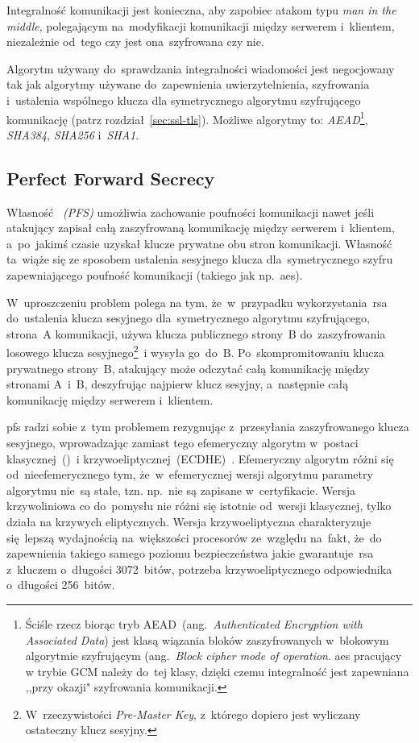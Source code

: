 \documentclass[thesis]{subfiles}
\begin{document}
Integralność komunikacji jest konieczna, aby zapobiec atakom typu \emph{man in the middle}, polegającym na~modyfikacji komunikacji między serwerem i~klientem, niezależnie od~tego czy jest ona~szyfrowana czy nie.

Algorytm używany do~sprawdzania integralności wiadomości jest negocjowany tak jak algorytmy używane do~zapewnienia uwierzytelnienia, szyfrowania i~ustalenia wspólnego klucza dla symetrycznego algorytmu szyfrującego komunikację (patrz rozdział~\ref{sec:ssl-tls}). Możliwe algorytmy to: \emph{AEAD}\footnote{Ściśle rzecz biorąc tryb AEAD~(ang.~\emph{Authenticated Encryption with Associated Data}) jest klasą wiązania bloków zaszyfrowanych w~blokowym algorytmie szyfrującym (ang.~\emph{Block cipher mode of operation}. \gls{aes} pracujący w trybie GCM należy do~tej klasy, dzięki czemu integralność jest zapewniana ,,przy okazji" szyfrowania komunikacji.}, \emph{SHA384}, \emph{SHA256} i~\emph{SHA1}.


\subsection{Perfect Forward Secrecy}
\label{sec:pfs}

Własność \emph{~(PFS)} umożliwia zachowanie poufności komunikacji nawet jeśli atakujący zapisał całą zaszyfrowaną komunikację między serwerem i~klientem, a~po~jakimś czasie uzyskał klucze prywatne obu stron komunikacji. Własność ta~wiąże się ze sposobem ustalenia sesyjnego klucza dla~symetrycznego szyfru zapewniającego poufność komunikacji (takiego jak np.~\gls{aes}).

W~uproszczeniu problem polega na tym, że~w~przypadku wykorzystania~\gls{rsa} do~ustalenia klucza sesyjnego dla~symetrycznego algorytmu szyfrującego, strona~A komunikacji, używa klucza publicznego strony~B do~zaszyfrowania losowego klucza sesyjnego\footnote{W~rzeczywistości \emph{Pre-Master Key}, z~którego dopiero jest wyliczany ostateczny klucz sesyjny.}~i wysyła go~do~B. Po~skompromitowaniu klucza prywatnego strony~B, atakujący może odczytać całą komunikację między stronami A~i~B, deszyfrując najpierw klucz sesyjny, a~następnie całą komunikację między serwerem i~klientem.

\gls{pfs} radzi sobie z~tym problemem rezygnując z~przesyłania zaszyfrowanego klucza sesyjnego, wprowadzając zamiast tego efemeryczny algorytm  w~postaci klasycznej~()~i krzywoeliptycznej~(ECDHE)~\cite{mimuw-ssl-w04,openssl-cookbook-suites}. Efemeryczny algorytm  różni się od~nieefemerycznego tym, że~w~efemerycznej wersji algorytmu parametry algorytmu nie~są stałe, tzn. np.~nie są zapisane w~certyfikacie. Wersja krzywoliniowa co do~pomysłu nie różni się istotnie od~wersji klasycznej, tylko działa na krzywych eliptycznych. Wersja krzywoeliptyczna charakteryzuje się~lepszą wydajnością na~większości procesorów ze~względu na~fakt, że~do zapewnienia takiego samego poziomu bezpieczeństwa jakie gwarantuje~\gls{rsa} z~kluczem o~długości 3072~bitów, potrzeba krzywoeliptycznego odpowiednika o~długości 256~bitów.
\end{document}
